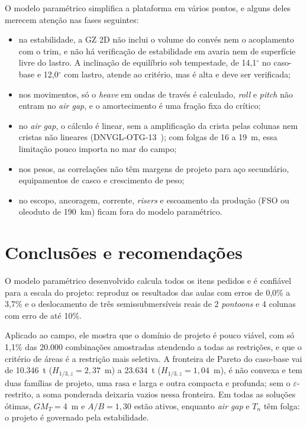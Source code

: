 \documentclass[11pt,a4paper]{article}
\newcommand{\Hz}{H_{1/3,z}}
\begin{document}
O modelo paramétrico simplifica a plataforma em vários pontos, e alguns deles merecem atenção nas
fases seguintes:
\begin{itemize}
\item na estabilidade, a GZ 2D não inclui o volume do convés nem o acoplamento com o trim, e não há
verificação de estabilidade em avaria nem de superfície livre do lastro. A inclinação de equilíbrio
sob tempestade, de 14,1$^\circ$ no caso-base e 12,0$^\circ$ com lastro, atende ao critério, mas é
alta e deve ser verificada;
\item nos movimentos, só o \emph{heave} em ondas de través é calculado, \emph{roll} e \emph{pitch}
não entram no \emph{air gap}, e o amortecimento é uma fração fixa do crítico;
\item no \emph{air gap}, o cálculo é linear, sem a amplificação da crista pelas colunas nem cristas
não lineares (DNVGL-OTG-13~\cite{otg13}); com folgas de 16 a 19~m, essa limitação pouco importa no
mar do campo;
\item nos pesos, as correlações não têm margens de projeto para aço secundário, equipamentos de
casco e crescimento de peso;
\item no escopo, ancoragem, corrente, \emph{risers} e escoamento da produção (FSO ou oleoduto de
190~km) ficam fora do modelo paramétrico.
\end{itemize}

\section{Conclusões e recomendações}\label{sec:conclusoes}

O modelo paramétrico desenvolvido calcula todos os itens pedidos e é confiável para a escala do
projeto: reproduz os resultados das aulas com erros de 0,0\% a 3,7\% e o deslocamento de três
semissubmersíveis reais de 2 \emph{pontoons} e 4 colunas com erro de até 10\%.

Aplicado ao campo, ele mostra que o domínio de projeto é pouco viável, com só 1,1\% das 20.000
combinações amostradas atendendo a todas as restrições, e que o critério de áreas é a restrição mais
seletiva. A fronteira de Pareto do caso-base vai de 10.346~t ($\Hz = 2{,}37$~m) a 23.634~t
($\Hz = 1{,}04$~m), é não convexa e tem duas famílias de projeto, uma rasa e larga e outra compacta
e profunda; sem o $\varepsilon$-restrito, a soma ponderada deixaria vazios nessa fronteira. Em
todas as soluções ótimas, $GM_T = 4$~m e $A/B = 1{,}30$ estão ativos, enquanto \emph{air gap} e
$T_n$ têm folga: o projeto é governado pela estabilidade.
\end{document}
